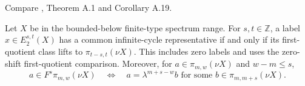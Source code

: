 \begin{theorem}
\label{sem:Literature:complete-permanent-lifts}
Compare \cite{BHS}, Theorem A.1 and Corollary A.19.\par

Let $X$ be in the bounded-below finite-type spectrum range. For
$s,t\in\mathbb Z$, a label $x\in E_2^{s,t}(X)$ has a common
infinite-cycle representative if and only if its first-quotient class
lifts to $\pi_{t-s,t}(\nu X)$. This includes zero labels and uses the
zero-shift first-quotient comparison. Moreover, for
$a\in\pi_{m,w}(\nu X)$ and $w-m\le s$,
\[
 a\in F^s\pi_{m,w}(\nu X)
 \quad\Longleftrightarrow\quad
 a=\lambda^{m+s-w}b
 \text{ for some }b\in\pi_{m,m+s}(\nu X).
\]

\end{theorem}
